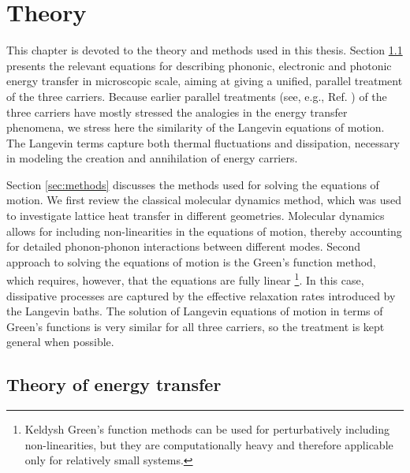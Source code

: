 \chapter{Theory}
\label{chap:theory}

This chapter is devoted to the theory and methods used in this thesis. Section \ref{sec:theory} presents the relevant equations for describing phononic, electronic and photonic energy transfer in microscopic scale, aiming at giving a unified, parallel treatment of the three carriers. Because earlier parallel treatments (see, e.g., Ref. \cite{chen}) of the three carriers have mostly stressed the analogies in the energy transfer phenomena, we stress here the similarity of the Langevin equations of motion. The Langevin terms capture both thermal fluctuations and dissipation, necessary in modeling the creation and annihilation of energy carriers. 

Section \ref{sec:methods} discusses the methods used for solving the equations of motion. We first review the classical molecular dynamics method, which was used to investigate lattice heat transfer in different geometries. Molecular dynamics allows for including non-linearities in the equations of motion, thereby accounting for detailed phonon-phonon interactions between different modes. Second approach to solving the equations of motion is the Green's function method, which requires, however, that the equations are fully linear \footnote{Keldysh Green's function methods \cite{haugjauho,wang08} can be used for perturbatively including non-linearities, but they are computationally heavy and therefore applicable only for relatively small systems.}. In this case, dissipative processes are captured by the effective relaxation rates introduced by the Langevin baths. The solution of Langevin equations of motion in terms of Green's functions is very similar for all three carriers, so the treatment is kept general when possible.
 


% 

\section{Theory of energy transfer}
\label{sec:theory}

